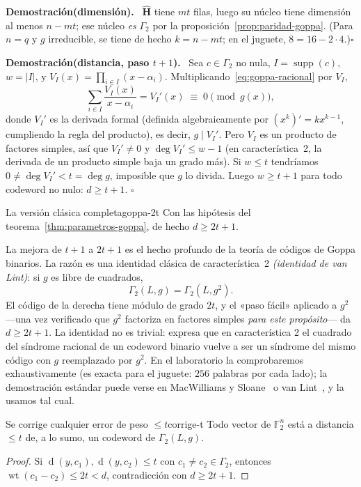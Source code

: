 \documentclass[11pt,a4paper,oneside]{report}
\newcommand{\demostracion}[1]{\par\smallskip\noindent\textbf{\color{mcgreen}Demostración#1.}\ }
\newcommand{\findem}{\hfill$\square$\par\smallskip}
\newcommand{\F}{\mathbb{F}}
\newcommand{\wt}{\operatorname{wt}}
\newcommand{\supp}{\operatorname{supp}}
\newcommand{\dist}{\operatorname{d}}
\newcommand{\Hmat}{\mathbf{H}}          %
\newcommand{\Ftwo}{\F_2}
\begin{document}
\demostracion{(dimensión)}
$\hat{\Hmat}$ tiene $mt$ filas, luego su núcleo tiene dimensión al menos
$n-mt$; ese núcleo \emph{es} $\Gamma_2$ por la
proposición~\ref{prop:paridad-goppa}. (Para $n=q$ y $g$ irreducible, se
tiene de hecho $k=n-mt$; en el juguete, $8=16-2\cdot4$.)\findem

\demostracion{(distancia, paso $t+1$)}
Sea $c\in\Gamma_2$ no nula, $I=\supp(c)$, $w=|I|$, y
$V_I(x)=\prod_{i\in I}(x-\alpha_i)$. Multiplicando~\eqref{eq:goppa-racional}
por $V_I$,
\[
\sum_{i\in I}\frac{V_I(x)}{x-\alpha_i}=V_I'(x)\;\equiv\;0 \pmod{g(x)},
\]
donde $V_I'$ es la derivada formal (definida algebraicamente por
$(x^k)'=kx^{k-1}$, cumpliendo la regla del producto), es decir, $g\mid V_I'$.
Pero $V_I$ es un producto de factores simples, así que $V_I'\neq0$ y
$\deg V_I'\le w-1$ (en característica~2, la derivada de un producto simple
baja un grado más). Si $w\le t$ tendríamos
$0\neq\deg V_I'<t=\deg g$, imposible que $g$ lo divida. Luego $w\ge t+1$
para todo codeword no nulo: $d\ge t+1$. \findem

\begin{teorema}{La versión clásica completa}{goppa-2t}
Con las hipótesis del teorema~\ref{thm:parametros-goppa}, de hecho $d\ge
2t+1$.
\end{teorema}

La mejora de $t+1$ a $2t+1$ es el hecho profundo de la teoría de códigos
de Goppa binarios. La razón es una identidad clásica de característica~2
\emph{(identidad de van Lint)}: si $g$ es libre de cuadrados,
\begin{equation}
\Gamma_2(L,g)=\Gamma_2(L,g^2).
\label{eq:vanlint}
\end{equation}
El código de la derecha tiene módulo de grado $2t$, y el «paso fácil»
aplicado a $g^2$ ---una vez verificado que $g^2$ factoriza en factores
simples \emph{para este propósito}--- da $d\ge 2t+1$. La identidad no es
trivial: expresa que en característica 2 el cuadrado del síndrome racional
de un codeword binario vuelve a ser un síndrome del mismo código con
$g$ reemplazado por $g^2$. En el laboratorio la comprobaremos
exhaustivamente (es exacta para el juguete: $256$ palabras por cada lado);
la demostración estándar puede verse en MacWilliams y
Sloane~\cite{msbook} o van Lint~\cite{vlint}, y la usamos tal cual.

\begin{corolario}{Se corrige cualquier error de peso $\le t$}{corrige-t}
Todo vector de $\Ftwo^n$ está a distancia $\le t$ de, a lo sumo, un
codeword de $\Gamma_2(L,g)$.
\end{corolario}
\begin{proof}
Si $\dist(y,c_1),\dist(y,c_2)\le t$ con $c_1\neq c_2\in\Gamma_2$, entonces
$\wt(c_1-c_2)\le 2t<d$, contradicción con $d\ge2t+1$.
\end{proof}
\end{document}
